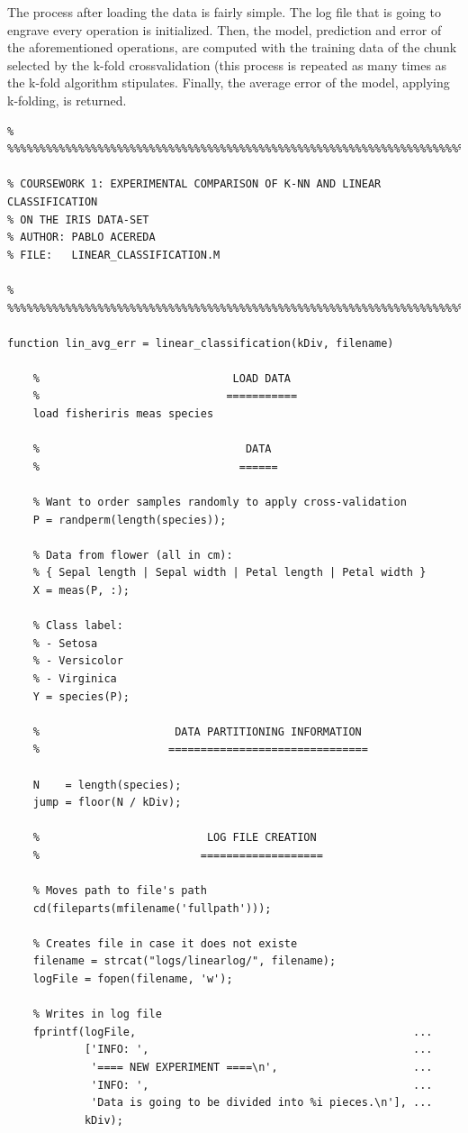 \documentclass[11pt]{article}
\begin{document}
The process after loading the data is fairly simple. The log file that is going
to engrave every operation is initialized. Then, the model, prediction and error
of the aforementioned operations, are computed with the training data of the
chunk selected by the k-fold crossvalidation (this process is repeated as many
times as the k-fold algorithm stipulates. Finally, the average error of the
model, applying k-folding, is returned.

\begin{verbatim}
% %%%%%%%%%%%%%%%%%%%%%%%%%%%%%%%%%%%%%%%%%%%%%%%%%%%%%%%%%%%%%%%%%%%%%%%%%

% COURSEWORK 1: EXPERIMENTAL COMPARISON OF K-NN AND LINEAR CLASSIFICATION
% ON THE IRIS DATA-SET
% AUTHOR: PABLO ACEREDA
% FILE:   LINEAR_CLASSIFICATION.M

% %%%%%%%%%%%%%%%%%%%%%%%%%%%%%%%%%%%%%%%%%%%%%%%%%%%%%%%%%%%%%%%%%%%%%%%%%

function lin_avg_err = linear_classification(kDiv, filename)

    %                              LOAD DATA
    %                             ===========
    load fisheriris meas species

    %                                DATA 
    %                               ======

    % Want to order samples randomly to apply cross-validation
    P = randperm(length(species));

    % Data from flower (all in cm):
    % { Sepal length | Sepal width | Petal length | Petal width }
    X = meas(P, :);

    % Class label:
    % - Setosa
    % - Versicolor
    % - Virginica
    Y = species(P);

    %                     DATA PARTITIONING INFORMATION
    %                    ===============================

    N    = length(species);
    jump = floor(N / kDiv);

    %                          LOG FILE CREATION
    %                         ===================

    % Moves path to file's path
    cd(fileparts(mfilename('fullpath')));

    % Creates file in case it does not existe
    filename = strcat("logs/linearlog/", filename);
    logFile = fopen(filename, 'w');

    % Writes in log file
    fprintf(logFile,                                           ...
            ['INFO: ',                                         ...
             '==== NEW EXPERIMENT ====\n',                     ...
             'INFO: ',                                         ...
             'Data is going to be divided into %i pieces.\n'], ...
            kDiv);


\end{verbatim}
\end{document}
